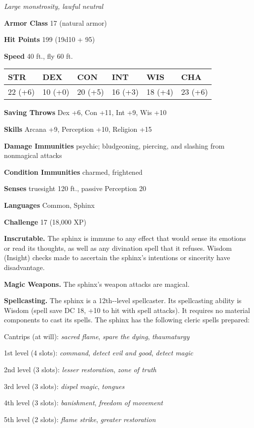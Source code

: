 \documentclass[
]{article}
\begin{document}
\emph{Large monstrosity, lawful neutral}

\textbf{Armor Class} 17 (natural armor)

\textbf{Hit Points} 199 (19d10 + 95)

\textbf{Speed} 40 ft., fly 60 ft.

\begin{longtable}[]{@{}llllll@{}}
\toprule
STR & DEX & CON & INT & WIS & CHA\tabularnewline
\midrule
\endhead
22 (+6) & 10 (+0) & 20 (+5) & 16 (+3) & 18 (+4) & 23 (+6)\tabularnewline
\bottomrule
\end{longtable}

\textbf{Saving Throws} Dex +6, Con +11, Int +9, Wis +10

\textbf{Skills} Arcana +9, Perception +10, Religion +15

\textbf{Damage Immunities} psychic; bludgeoning, piercing, and slashing
from nonmagical attacks

\textbf{Condition Immunities} charmed, frightened

\textbf{Senses} truesight 120 ft., passive Perception 20

\textbf{Languages} Common, Sphinx

\textbf{Challenge} 17 (18,000 XP)

\textbf{Inscrutable.} The sphinx is immune to any effect that would
sense its emotions or read its thoughts, as well as any divination spell
that it refuses. Wisdom (Insight) checks made to ascertain the sphinx's
intentions or sincerity have disadvantage.

\textbf{Magic Weapons.} The sphinx's weapon attacks are magical.

\textbf{Spellcasting.} The sphinx is a 12th-­‐level spellcaster. Its
spellcasting ability is Wisdom (spell save DC 18, +10 to hit with spell
attacks). It requires no material components to cast its spells. The
sphinx has the following cleric spells prepared:

Cantrips (at will): \emph{sacred flame}, \emph{spare the dying},
\emph{thaumaturgy}

1st level (4 slots): \emph{command}, \emph{detect evil and good},
\emph{detect magic}

2nd level (3 slots): \emph{lesser restoration}, \emph{zone of truth}

3rd level (3 slots): \emph{dispel magic}, \emph{tongues}

4th level (3 slots): \emph{banishment}, \emph{freedom of movement}

5th level (2 slots): \emph{flame strike}, \emph{greater restoration}
\end{document}
